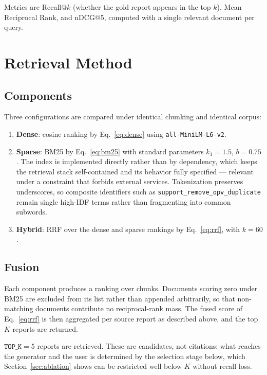 \documentclass[12pt, a4paper]{article}
\begin{document}
Metrics are Recall@$k$ (whether the gold report appears in the top $k$), Mean Reciprocal Rank, and nDCG@5, computed with a single relevant document per query.

\section{Retrieval Method}
\label{sec:retrieval}

\subsection{Components}

Three configurations are compared under identical chunking and identical corpus:

\begin{enumerate}
    \item \textbf{Dense}: cosine ranking by Eq.~\eqref{eq:dense} using \texttt{all-MiniLM-L6-v2}.
    \item \textbf{Sparse}: BM25 by Eq.~\eqref{eq:bm25} with standard parameters $k_1 = 1.5$, $b = 0.75$. The index is implemented directly rather than by dependency, which keeps the retrieval stack self-contained and its behavior fully specified — relevant under a constraint that forbids external services. Tokenization preserves underscores, so composite identifiers such as \texttt{support\_remove\_opv\_duplicate} remain single high-IDF terms rather than fragmenting into common subwords.
    \item \textbf{Hybrid}: RRF over the dense and sparse rankings by Eq.~\eqref{eq:rrf}, with $k = 60$.
\end{enumerate}

\subsection{Fusion}

Each component produces a ranking over chunks. Documents scoring zero under BM25 are excluded from its list rather than appended arbitrarily, so that non-matching documents contribute no reciprocal-rank mass. The fused score of Eq.~\eqref{eq:rrf} is then aggregated per source report as described above, and the top $K$ reports are returned.

$\texttt{TOP\_K} = 5$ reports are retrieved. These are candidates, not citations: what reaches the generator and the user is determined by the selection stage below, which Section~\ref{sec:ablation} shows can be restricted well below $K$ without recall loss.
\end{document}
